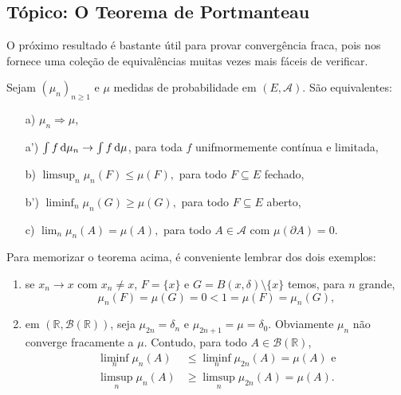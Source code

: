 \begin{topics}
  \section{Tópico: O Teorema de Portmanteau}

  O próximo resultado é bastante útil para provar convergência fraca, pois nos fornece uma coleção de equivalências muitas vezes mais fáceis de verificar.

  \begin{theorem}
    \label{t:portmanteau}
    Sejam $(\mu_n)_{n \geq 1}$ e $\mu$ medidas de probabilidade em $(E, \mathcal{A})$.
    São equivalentes:
    \begin{enumerate}[\quad a)]
    \item[a)] $\mu_n \Rightarrow \mu$,
    \item[a')] $\int f \mathop{}\!\mathrm{d} \mu_n \to \int f \mathop{}\!\mathrm{d} \mu$, para toda $f$ unifmormemente contínua e limitada,
    \item[b)] $\limsup_n \mu_n(F) \leq \mu(F),$ para todo $F \subseteq E$ fechado,
    \item[b')] $\liminf_n \mu_n(G) \geq \mu(G),$ para todo $F \subseteq E$ aberto,
    \item[c)] $\lim_n \mu_n(A) = \mu(A),$ para todo $A \in \mathcal{A}$ com $\mu(\partial A) = 0$.
    \end{enumerate}
  \end{theorem}

  Para memorizar o teorema acima, é conveniente lembrar dos dois exemplos:
  \begin{enumerate}[\quad i)]
    \item se $x_n \to x$ com $x_n \neq x$, $F = \{x\}$ e $G = B(x, \delta) \setminus \{x\}$ temos, para $n$ grande,
      \begin{equation}
        \mu_n(F) = \mu(G) = 0 < 1 = \mu(F) = \mu_n(G),
      \end{equation}
    \item em $(\mathbb{R},\mathcal{B}(\mathbb{R}))$, seja $\mu_{2n} = \delta_n$ e $\mu_{2n+1} = \mu = \delta_0$.
      Obviamente $\mu_n$ não converge fracamente a $\mu$. Contudo, para todo $A \in \mathcal{B}(\mathbb{R})$,
      \begin{equation}
        \begin{split}
          \liminf_n \mu_n (A) & \leq \liminf_n \mu_{2n}(A) = \mu(A) \text{ e}\\
          \limsup_n \mu_n (A) & \geq \limsup_n \mu_{2n}(A) = \mu(A).
        \end{split}
      \end{equation}
  \end{enumerate}


\end{topics}
